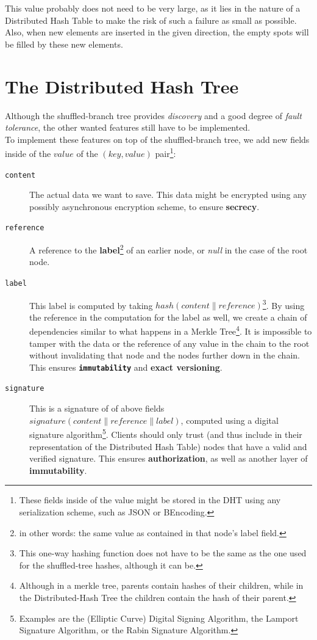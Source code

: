 \documentclass[a4paper]{article}
\begin{document}
This value probably does not need to be very large, as it lies in the nature of a Distributed Hash Table to make the risk of such a failure as small as possible. Also, when new elements are inserted in the given direction, the empty spots will be filled by these new elements.


\section{The Distributed Hash Tree}
Although the shuffled-branch tree provides \textit{discovery} and a good degree of \textit{fault tolerance}, the other wanted features still have to be implemented.\\


To implement these features on top of the shuffled-branch tree, we add new fields inside of the $value$ of the $(key,value)$ pair\footnote{These fields inside of the value might be stored in the DHT using any serialization scheme, such as JSON or BEncoding.}:


\begin{description}
	\item[\texttt{content}] The actual data we want to save. This data might be encrypted using any possibly asynchronous encryption scheme, to ensure \textbf{secrecy}.
	\item[\texttt{reference}] A reference to the \textbf{label}\footnote{in other words: the same value as contained in that node's label field.} of an earlier node, or \textit{null} in the case of the root node.
	\item[\texttt{label}] This label is computed by taking $hash(content \parallel reference)$\footnote{This one-way hashing function does not have to be the same as the one used for the shuffled-tree hashes, although it can be.}. By using the reference in the computation for the label as well, we create a chain of dependencies similar to what happens in a Merkle Tree\footnote{%
	Although in a merkle tree, parents contain hashes of their children, while in the Distributed-Hash Tree the children contain the hash of their parent.}. It is impossible to tamper with the data or the reference of any value in the chain to the root without invalidating that node and the nodes further down in the chain. This ensures \textbf{\texttt{immutability}} and \textbf{exact versioning}.
	\item[\texttt{signature}] This is a signature of of above fields $signature(content \parallel reference \parallel label)$, computed using a digital signature algorithm\footnote{Examples are the (Elliptic Curve) Digital Signing Algorithm, the Lamport Signature Algorithm, or the Rabin Signature Algorithm.}. Clients should only trust (and thus include in their representation of the Distributed Hash Table) nodes that have a valid and verified signature. This ensures \textbf{authorization}, as well as another layer of \textbf{immutability}.
\end{description}
\end{document}
